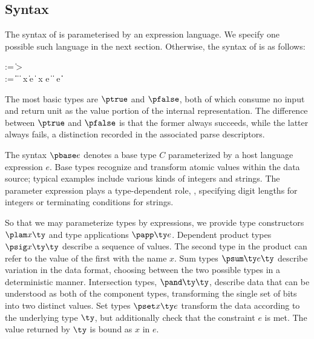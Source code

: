 \subsection{\ddc{} Syntax}
The syntax of \ddc{} is parameterised by an expression language.  We specify one possible such language in the next section.  Otherwise,
the syntax of \ddc{} is as follows:
\begin{bnf}
   \meta{\gk} \::= \kty \| \ity \-> \gk 
                               \pext{\| \gk \-> \gk} \\
   \meta{\ty} \::= 
    \ptrue\| \pfalse \|  \| 
    \plam{\var}{\ity}{\ty} \|  \nlalt
    \psig x \ty \ty \| \psum \ty e \ty \| \pand \ty \ty \nlalt 
    \pset x \ty e \|
    \pseq \ty {} \nlalt
    \ptyvar \| \pmu{\ptyvar}{\ty} \nlalt
    \pcompute e \ity \| \pabsorb \ty \| \pscan{\ty} 
\end{bnf}%
\noindent
The most basic types are $\ptrue$ and $\pfalse$, both of which consume no input
and return unit as the value portion of the internal representation. 
The difference between $\ptrue$ and $\pfalse$ is that the former always succeeds, while the latter always fails, a distinction recorded in the associated parse descriptors.


The syntax $\pbase e$ denotes a base type $C$ parameterized by a host language expression $e$.
Base types recognize and transform atomic values within the
data source; typical examples include various kinds of integers and strings. 
The parameter expression plays a type-dependent role, \eg{}, specifying digit lengths for integers or terminating conditions for strings.

So that we may parameterize types by expressions, we provide type constructors
$\plam x {} \ty$ and type applications $\papp \ty e$.
Dependent product types $\psig x \ty \ty$ describe a sequence of
values. The second type in the product can refer to the value of the
first with the name $x$. Sum types $\psum \ty e \ty$ describe
variation in the data format, choosing between the two possible types
in a deterministic manner. Intersection types, $\pand \ty \ty$,
describe data that can be understood as both of the component types,
transforming the single set of bits into two distinct values.  Set
types $\pset x \ty e$ transform the data according to the underlying
type $\ty$, but additionally check that the constraint $e$ is met.
The value returned by $\ty$ is bound as $x$ in $e$.

